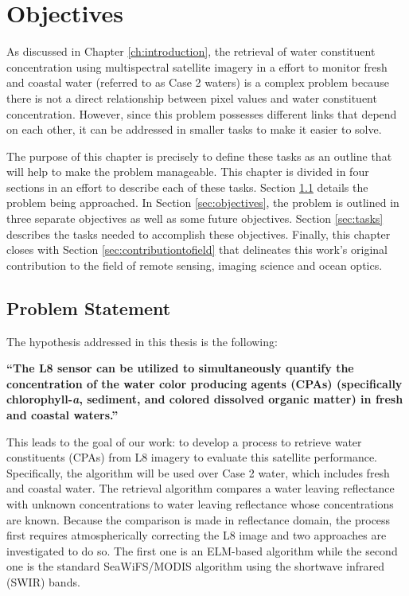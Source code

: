 \chapter{Objectives}
\label{ch:objectives}

As discussed in Chapter \ref{ch:introduction},  the retrieval of water constituent concentration using multispectral satellite imagery in a effort to monitor fresh and coastal water (referred to as Case 2 waters) is a complex problem because there is not a direct relationship between pixel values and water constituent concentration. However, since this problem possesses different links that depend on each other, it can be addressed in smaller tasks to make it easier to solve. 

The purpose of this chapter is precisely to define these tasks as an outline that will help to make the problem manageable. This chapter is divided in four sections in an effort to describe each of these tasks. Section \ref{sec:problemstatement} details the problem being approached. In Section \ref{sec:objectives}, the problem is outlined in {\color{red} three} separate objectives as well as some future objectives. Section \ref{sec:tasks} describes the tasks needed to accomplish these objectives. Finally, this chapter closes with Section \ref{sec:contributiontofield} that delineates this work's original contribution to the field of remote sensing, imaging science and ocean optics. 
\section{Problem Statement}
\label{sec:problemstatement}
The hypothesis addressed in this thesis is the following: 

{ \bf ``The L8 sensor can be utilized to simultaneously quantify the concentration of the water color producing agents (CPAs) (specifically chlorophyll-{\it a}, { sediment}, and colored dissolved organic matter) in fresh and coastal waters.''} 

This leads to the goal of our work: to develop a process to retrieve water constituents (CPAs) from L8 imagery to evaluate this satellite performance. Specifically, the algorithm will be used over Case 2 water, which includes fresh and coastal water. The retrieval algorithm compares a water leaving reflectance with unknown concentrations to water leaving reflectance whose concentrations are known. Because the comparison is made in reflectance domain, the process first requires atmospherically correcting the L8 image and two approaches are investigated to do so. The first one is an ELM-based algorithm while the second one is the standard SeaWiFS/MODIS algorithm using the shortwave infrared (SWIR) bands.

